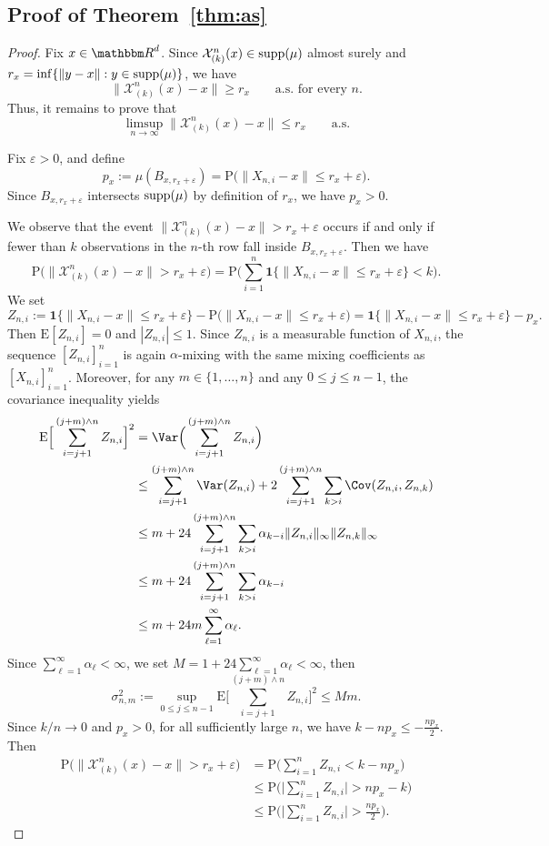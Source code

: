 \documentclass[12pt]{article}
\def\P{{\mathrm P}}
\def\E{{\mathrm E}}
\def\R{{\mathbbm R}}
\theoremstyle{definition}
\begin{document}
\subsection{Proof of Theorem~\ref{thm:as}}

\begin{proof}

Fix \(x\in \R^d\). Since \(\mathcal X_{(k)}^n(x)\in {\rm supp}(\mu)\) almost surely and $r_x =\inf\{\|y-x\|: y\in {\rm supp}(\mu)\}$, we have
\[
\|\mathcal X_{(k)}^n(x)-x\| \ge r_x
\qquad\text{a.s. for every }n.
\]
Thus, it remains to prove that
\[
\limsup_{n\to\infty}\|\mathcal X_{(k)}^n(x)-x\| \le r_x
\qquad\text{a.s.}
\]

Fix \(\varepsilon>0\), and define
\[
p_x := \mu(B_{x,r_x+\varepsilon})
= \P\big(\|X_{n,i}-x\|\le r_x+\varepsilon\big).
\]
Since \(B_{x,r_x+\varepsilon}\) intersects \({\rm supp}(\mu)\) by definition of \(r_x\), we have \(p_x>0\).

We observe that the event \(\|\mathcal X_{(k)}^n(x)-x\|>r_x+\varepsilon\) occurs if and only if fewer than \(k\) observations in the $n$-th row fall inside \(B_{x,r_x+\varepsilon}\). Then we have
\[
\P\big(\|\mathcal X_{(k)}^n(x)-x\|>r_x+\varepsilon\big)
=
\P\Big(\sum_{i=1}^n \mathbf 1\{\|X_{n,i}-x\|\le r_x+\varepsilon\}<k\Big).
\]
We set
\[
Z_{n,i}
:=
\mathbf 1\{\|X_{n,i}-x\|\le r_x+\varepsilon\}
-
\P\big(\|X_{n,i}-x\|\le r_x+\varepsilon\big)
=
\mathbf 1\{\|X_{n,i}-x\|\le r_x+\varepsilon\}-p_x.
\]
Then \(\E[Z_{n,i}]=0\) and \(|Z_{n,i}|\le 1\). Since \(Z_{n,i}\) is a measurable function of \(X_{n,i}\), the sequence \([Z_{n,i}]_{i=1}^n\) is again \(\alpha\)-mixing with the same mixing coefficients as \([X_{n,i}]_{i=1}^n\). Moreover, for any \(m\in\{1,\dots,n\}\) and any \(0\le j\le n-1\), the covariance inequality \citep[Corollary of Lemma 2.1]{davydov1968convergence} yields
\begin{align*}
\E\Big[\sum_{i=j+1}^{(j+m)\wedge n} Z_{n,i}\Big]^2
&=
\Var\Big(\sum_{i=j+1}^{(j+m)\wedge n} Z_{n,i}\Big) \\
&\le \sum_{i=j+1}^{(j+m)\wedge n}\Var(Z_{n,i})
+2\sum_{i=j+1}^{(j+m)\wedge n}\sum_{k>i}\Cov(Z_{n,i},Z_{n,k}) \\
&\le
m + 24\sum_{i=j+1}^{(j+m)\wedge n}\sum_{k>i}\alpha_{k-i}
\|Z_{n,i}\|_\infty \|Z_{n,k}\|_\infty \\
&\le
m + 24\sum_{i=j+1}^{(j+m)\wedge n}\sum_{k>i}\alpha_{k-i} \\
&\le
m + 24m\sum_{\ell=1}^\infty \alpha_\ell.
\end{align*}
Since \(\sum_{\ell=1}^\infty \alpha_\ell<\infty\), we set $M = 1+24\sum_{\ell=1}^\infty \alpha_\ell <\infty$, then
\[
\sigma_{n,m}^2
:=
\sup_{0\le j\le n-1}
\E\Big[\sum_{i=j+1}^{(j+m)\wedge n} Z_{n,i}\Big]^2
\le Mm.
\]
Since \(k/n\to 0\) and \(p_x>0\), for all sufficiently large $n$, we have $k-np_x \le -\frac{np_x}{2}$. Then
\begin{align*}
\P\big(\|\mathcal X_{(k)}^n(x)-x\|>r_x+\varepsilon\big)
&=
\P\Big(\sum_{i=1}^n Z_{n,i}<k-np_x\Big) \\
&\le
\P\Big(\Big|\sum_{i=1}^n Z_{n,i}\Big|>np_x-k\Big) \\
&\le
\P\Big(\Big|\sum_{i=1}^n Z_{n,i}\Big|>\frac{np_x}{2}\Big).
\end{align*}


\end{proof}
\end{document}

